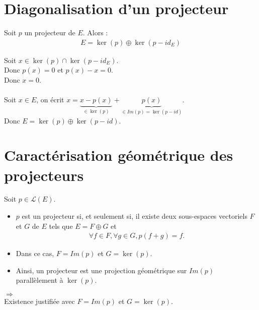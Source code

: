 \documentclass[../main.tex]{subfiles}
\begin{document}
\section{Diagonalisation d'un projecteur}
\begin{tcolorbox}[title=Théorème 21.53, title filled=false, colframe=orange, colback=orange!10!white]
    Soit $p$ un projecteur de $E$. Alors : 
    \begin{align*}
        E = \ker(p) \oplus \ker(p - id_E)
    \end{align*}
\end{tcolorbox}

\noindent Soit $x\in \ker(p) \cap \ker(p - id_E)$. \\
Donc $p(x) = 0$ et $p(x) - x = 0$. \\
Donc $x = 0$. \\ \\
Soit $x\in E$, on écrit $x = \underbrace{x - p(x)}_{\in \ker(p)} + \underbrace{p(x)}_{\in Im(p) = \ker(p - id)}$. \\
Donc $E = \ker(p) \oplus \ker(p - id)$. \\

\section{Caractérisation géométrique des projecteurs}
\begin{tcolorbox}[title=Théorème 21.57, title filled=false, colframe=orange, colback=orange!10!white]
    Soit $p\in \mathcal{L}(E)$. 
    \begin{itemize}
        \item $p$ est un projecteur si, et seulement si, il existe deux sous-espaces vectoriels $F$ et $G$ de $E$ tels que $E = F \oplus G$ et 
        \begin{align*}
            \forall f \in F, \forall g \in G, p(f + g) = f. 
        \end{align*}
        \item Dans ce cas, $F = Im(p)$ et $G = \ker(p)$.
        \item Ainsi, un projecteur est une projection géométrique sur $Im(p)$ parallèlement à $\ker(p)$. 
    \end{itemize}
\end{tcolorbox}

$\boxed{\Rightarrow}$ \\
Existence justifiée avec $F = Im(p)$ et $G = \ker(p)$. \\ \\
\end{document}
